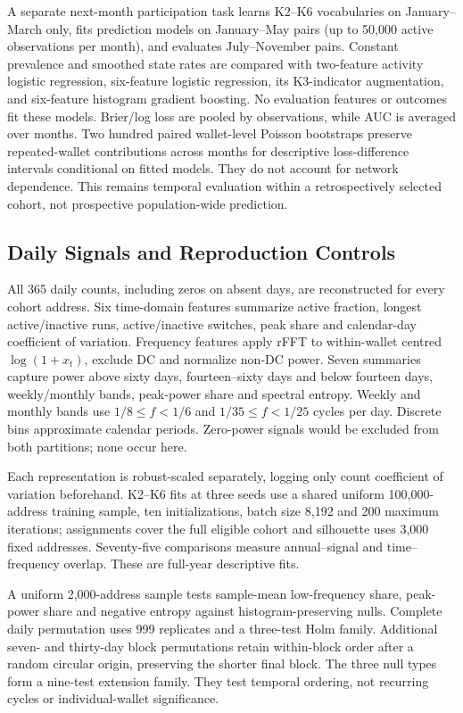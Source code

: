 \documentclass[journal,letterpaper]{IEEEtran}
\begin{document}
A separate next-month participation task learns K2--K6 vocabularies on January--March only, fits prediction models on January--May pairs (up to 50,000 active observations per month), and evaluates July--November pairs. Constant prevalence and smoothed state rates are compared with two-feature activity logistic regression, six-feature logistic regression, its K3-indicator augmentation, and six-feature histogram gradient boosting. No evaluation features or outcomes fit these models. Brier/log loss are pooled by observations, while AUC is averaged over months. Two hundred paired wallet-level Poisson bootstraps preserve repeated-wallet contributions across months for descriptive loss-difference intervals conditional on fitted models. They do not account for network dependence. This remains temporal evaluation within a retrospectively selected cohort, not prospective population-wide prediction.

\subsection{Daily Signals and Reproduction Controls}
All 365 daily counts, including zeros on absent days, are reconstructed for every cohort address. Six time-domain features summarize active fraction, longest active/inactive runs, active/inactive switches, peak share and calendar-day coefficient of variation. Frequency features apply rFFT to within-wallet centred $\log(1+x_t)$, exclude DC and normalize non-DC power. Seven summaries capture power above sixty days, fourteen--sixty days and below fourteen days, weekly/monthly bands, peak-power share and spectral entropy. Weekly and monthly bands use $1/8\le f<1/6$ and $1/35\le f<1/25$ cycles per day. Discrete bins approximate calendar periods. Zero-power signals would be excluded from both partitions; none occur here.

Each representation is robust-scaled separately, logging only count coefficient of variation beforehand. K2--K6 fits at three seeds use a shared uniform 100,000-address training sample, ten initializations, batch size 8,192 and 200 maximum iterations; assignments cover the full eligible cohort and silhouette uses 3,000 fixed addresses. Seventy-five comparisons measure annual--signal and time--frequency overlap. These are full-year descriptive fits.

A uniform 2,000-address sample tests sample-mean low-frequency share, peak-power share and negative entropy against histogram-preserving nulls. Complete daily permutation uses 999 replicates and a three-test Holm family. Additional seven- and thirty-day block permutations retain within-block order after a random circular origin, preserving the shorter final block. The three null types form a nine-test extension family. They test temporal ordering, not recurring cycles or individual-wallet significance.
\end{document}
